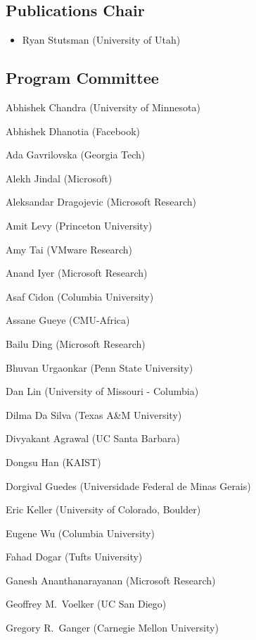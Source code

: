 \subsection*{Publications Chair}
\begin{itemize}
    \item[] Ryan Stutsman (University of Utah)
\end{itemize}

\clearpage

\setlength{\parindent}{2em}
\setlength{\parskip}{0.5em}
\subsection*{Program Committee}


Abhishek Chandra (University of Minnesota)

Abhishek Dhanotia (Facebook)

Ada Gavrilovska (Georgia Tech)

Alekh Jindal (Microsoft)

Aleksandar Dragojevic (Microsoft Research)

Amit Levy (Princeton University)

Amy Tai (VMware Research)

Anand Iyer (Microsoft Research)

Asaf Cidon (Columbia University)

Assane Gueye (CMU-Africa)

Bailu Ding (Microsoft Research)

Bhuvan Urgaonkar (Penn State University)

Dan Lin (University of Missouri - Columbia)

Dilma Da Silva (Texas A\&M University)

Divyakant Agrawal (UC Santa Barbara)

Dongsu Han (KAIST)

Dorgival Guedes (Universidade Federal de Minas Gerais)

Eric Keller (University of Colorado, Boulder)

Eugene Wu (Columbia University)

Fahad Dogar (Tufts University)

Ganesh Ananthanarayanan (Microsoft Research)

Geoffrey M.\ Voelker (UC San Diego)

Gregory R.\ Ganger (Carnegie Mellon University)

